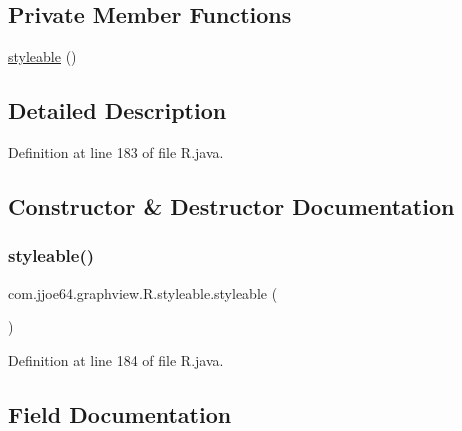 \subsection*{Private Member Functions}
\begin{DoxyCompactItemize}
\item 
\mbox{\hyperlink{classcom_1_1jjoe64_1_1graphview_1_1_r_1_1styleable_ac0168245fef8b29793762da1d4e82f65}{styleable}} ()
\end{DoxyCompactItemize}


\subsection{Detailed Description}


Definition at line 183 of file R.\+java.



\subsection{Constructor \& Destructor Documentation}
\mbox{\label{classcom_1_1jjoe64_1_1graphview_1_1_r_1_1styleable_ac0168245fef8b29793762da1d4e82f65}} 
\subsubsection{\texorpdfstring{styleable()}{styleable()}}
{\footnotesize\ttfamily com.\+jjoe64.\+graphview.\+R.\+styleable.\+styleable (\begin{DoxyParamCaption}{ }\end{DoxyParamCaption})\hspace{0.3cm}{\ttfamily [private]}}



Definition at line 184 of file R.\+java.


\begin{DoxyCode}{0}

\end{DoxyCode}


\subsection{Field Documentation}
\mbox{\label{classcom_1_1jjoe64_1_1graphview_1_1_r_1_1styleable_af683975ef36a8c7a39aba1617a3dabfc}} 
